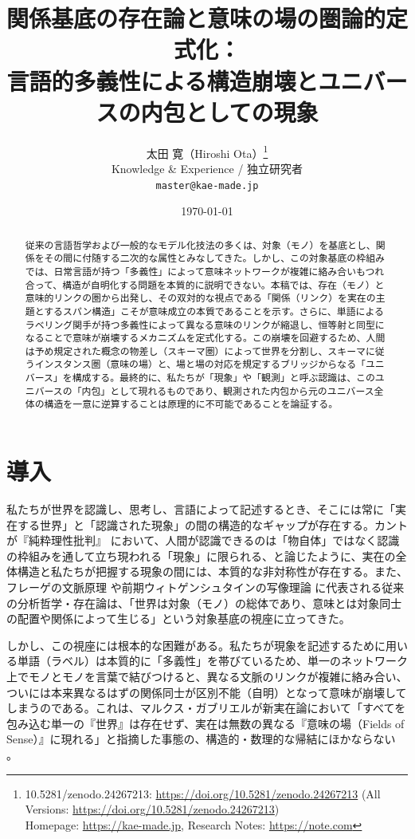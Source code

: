 \documentclass[11pt,a4paper,luatex]{jlreq}
\title{\textbf{関係基底の存在論と意味の場の圏論的定式化：} \\
\large 言語的多義性による構造崩壊とユニバースの内包としての現象}
\author{太田 寛（Hiroshi Ota）\thanks{10.5281/zenodo.24267213: \url{https://doi.org/10.5281/zenodo.24267213} (All Versions: \url{https://doi.org/10.5281/zenodo.24267213}) \\ Homepage: \url{https://kae-made.jp}, Research Notes: \url{https://note.com}} \\
\small Knowledge \& Experience / 独立研究者 \\
\small \texttt{master@kae-made.jp}}
\date{\today}
\theoremstyle{definition}
\theoremstyle{plain}
\begin{document}
\maketitle

\begin{abstract}
従来の言語哲学および一般的なモデル化技法の多くは、対象（モノ）を基底とし、関係をその間に付随する二次的な属性とみなしてきた。しかし、この対象基底の枠組みでは、日常言語が持つ「多義性」によって意味ネットワークが複雑に絡み合いもつれ合って、構造が自明化する問題を本質的に説明できない。本稿では、存在（モノ）と意味的リンクの圏から出発し、その双対的な視点である「関係（リンク）を実在の主題とするスパン構造」こそが意味成立の本質であることを示す。さらに、単語によるラベリング関手が持つ多義性によって異なる意味のリンクが縮退し、恒等射と同型になることで意味が崩壊するメカニズムを定式化する。この崩壊を回避するため、人間は予め規定された概念の物差し（スキーマ圏）によって世界を分割し、スキーマに従うインスタンス圏（意味の場）と、場と場の対応を規定するブリッジからなる「ユニバース」を構成する。最終的に、私たちが「現象」や「観測」と呼ぶ認識は、このユニバースの「内包」として現れるものであり、観測された内包から元のユニバース全体の構造を一意に逆算することは原理的に不可能であることを論証する。
\end{abstract}

\section{導入}

私たちが世界を認識し、思考し、言語によって記述するとき、そこには常に「実在する世界」と「認識された現象」の間の構造的なギャップが存在する。カントが『純粋理性批判』\cite{kant1781} において、人間が認識できるのは「物自体」ではなく認識の枠組みを通して立ち現われる「現象」に限られる、と論じたように、実在の全体構造と私たちが把握する現象の間には、本質的な非対称性が存在する。また、フレーゲの文脈原理 \cite{frege1892} や前期ウィトゲンシュタインの写像理論 \cite{wittgenstein1921} に代表される従来の分析哲学・存在論は、「世界は対象（モノ）の総体であり、意味とは対象同士の配置や関係によって生じる」という対象基底の視座に立ってきた。

しかし、この視座には根本的な困難がある。私たちが現象を記述するために用いる単語（ラベル）は本質的に「多義性」を帯びているため、単一のネットワーク上でモノとモノを言葉で結びつけると、異なる文脈のリンクが複雑に絡み合い、ついには本来異なるはずの関係同士が区別不能（自明）となって意味が崩壊してしまうのである。これは、マルクス・ガブリエルが新実在論において「すべてを包み込む単一の『世界』は存在せず、実在は無数の異なる『意味の場（Fields of Sense）』に現れる」と指摘した事態の、構造的・数理的な帰結にほかならない \cite{gabriel2013,gabriel2015}。
\end{document}
